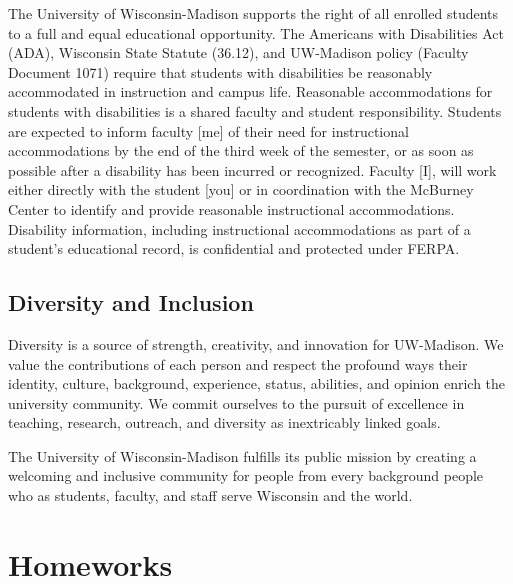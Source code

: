 \documentclass[
]{book}
\begin{document}
The University of Wisconsin-Madison supports the right of all enrolled students to a full and equal educational opportunity. The Americans with Disabilities Act (ADA), Wisconsin State Statute (36.12), and UW-Madison policy (Faculty Document 1071) require that students with disabilities be reasonably accommodated in instruction and campus life. Reasonable accommodations for students with disabilities is a shared faculty and student responsibility. Students are expected to inform faculty {[}me{]} of their need for instructional accommodations by the end of the third week of the semester, or as soon as possible after a disability has been incurred or recognized. Faculty {[}I{]}, will work either directly with the student {[}you{]} or in coordination with the McBurney Center to identify and provide reasonable instructional accommodations. Disability information, including instructional accommodations as part of a student's educational record, is confidential and protected under FERPA.

\hypertarget{diversity-and-inclusion}{%
\section{Diversity and Inclusion}\label{diversity-and-inclusion}}

Diversity is a source of strength, creativity, and innovation for UW-Madison. We value the contributions of each person and respect the profound ways their identity, culture, background, experience, status, abilities, and opinion enrich the university community. We commit ourselves to the pursuit of excellence in teaching, research, outreach, and diversity as inextricably linked goals.

The University of Wisconsin-Madison fulfills its public mission by creating a welcoming and inclusive community for people from every background people who as students, faculty, and staff serve Wisconsin and the world.

\hypertarget{homeworks}{%
\chapter{Homeworks}\label{homeworks}}
\end{document}

